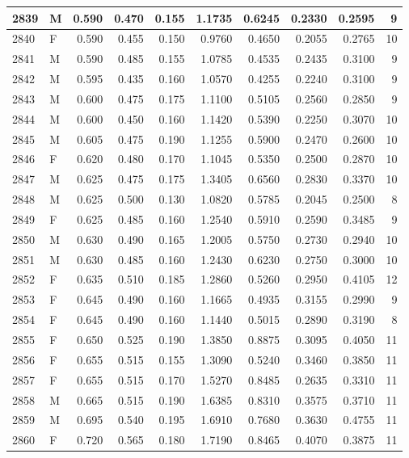 \documentclass[9pt,twocolumn,twoside,]{pnas-new}
\begin{document}
\begin{tabular}{l|l|r|r|r|r|r|r|r|r}
\hline
2839 & M & 0.590 & 0.470 & 0.155 & 1.1735 & 0.6245 & 0.2330 & 0.2595 & 9\\
\hline
2840 & F & 0.590 & 0.455 & 0.150 & 0.9760 & 0.4650 & 0.2055 & 0.2765 & 10\\
\hline
2841 & M & 0.590 & 0.485 & 0.155 & 1.0785 & 0.4535 & 0.2435 & 0.3100 & 9\\
\hline
2842 & M & 0.595 & 0.435 & 0.160 & 1.0570 & 0.4255 & 0.2240 & 0.3100 & 9\\
\hline
2843 & M & 0.600 & 0.475 & 0.175 & 1.1100 & 0.5105 & 0.2560 & 0.2850 & 9\\
\hline
2844 & M & 0.600 & 0.450 & 0.160 & 1.1420 & 0.5390 & 0.2250 & 0.3070 & 10\\
\hline
2845 & M & 0.605 & 0.475 & 0.190 & 1.1255 & 0.5900 & 0.2470 & 0.2600 & 10\\
\hline
2846 & F & 0.620 & 0.480 & 0.170 & 1.1045 & 0.5350 & 0.2500 & 0.2870 & 10\\
\hline
2847 & M & 0.625 & 0.475 & 0.175 & 1.3405 & 0.6560 & 0.2830 & 0.3370 & 10\\
\hline
2848 & M & 0.625 & 0.500 & 0.130 & 1.0820 & 0.5785 & 0.2045 & 0.2500 & 8\\
\hline
2849 & F & 0.625 & 0.485 & 0.160 & 1.2540 & 0.5910 & 0.2590 & 0.3485 & 9\\
\hline
2850 & M & 0.630 & 0.490 & 0.165 & 1.2005 & 0.5750 & 0.2730 & 0.2940 & 10\\
\hline
2851 & M & 0.630 & 0.485 & 0.160 & 1.2430 & 0.6230 & 0.2750 & 0.3000 & 10\\
\hline
2852 & F & 0.635 & 0.510 & 0.185 & 1.2860 & 0.5260 & 0.2950 & 0.4105 & 12\\
\hline
2853 & F & 0.645 & 0.490 & 0.160 & 1.1665 & 0.4935 & 0.3155 & 0.2990 & 9\\
\hline
2854 & F & 0.645 & 0.490 & 0.160 & 1.1440 & 0.5015 & 0.2890 & 0.3190 & 8\\
\hline
2855 & F & 0.650 & 0.525 & 0.190 & 1.3850 & 0.8875 & 0.3095 & 0.4050 & 11\\
\hline
2856 & F & 0.655 & 0.515 & 0.155 & 1.3090 & 0.5240 & 0.3460 & 0.3850 & 11\\
\hline
2857 & F & 0.655 & 0.515 & 0.170 & 1.5270 & 0.8485 & 0.2635 & 0.3310 & 11\\
\hline
2858 & M & 0.665 & 0.515 & 0.190 & 1.6385 & 0.8310 & 0.3575 & 0.3710 & 11\\
\hline
2859 & M & 0.695 & 0.540 & 0.195 & 1.6910 & 0.7680 & 0.3630 & 0.4755 & 11\\
\hline
2860 & F & 0.720 & 0.565 & 0.180 & 1.7190 & 0.8465 & 0.4070 & 0.3875 & 11\\

\end{tabular}
\end{document}

